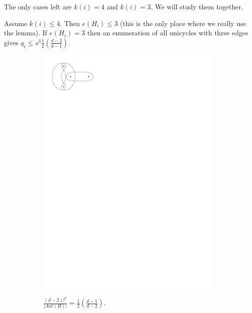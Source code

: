 \documentclass[11pt,notitlepage,a4paper]{article}
\theoremstyle{definition}
\begin{document}
\par

The only cases left are $k(i)=4$ and $k(i)=3$. 
We will study them together. \par
Assume $k(i)\leq 4$. Then $e(H_i)\leq 3$ 
(this is the only place where we 
really use the lemma).
If $e(H_i)=3$ then an enumeration
of all unicycles with three edges gives $q_i 
\leq s^{3}\frac{1}{2} \left( \frac{d-2}{d-1} \right)$. \par
\begin{figure}[H]
	\begin{subfigure}{.3\linewidth}
		\centering
		\includegraphics[width=0.7\linewidth]{Graph3edge1.pdf}
		\caption{$\frac{(d-2)!^3}{|Aut(H)|}=\frac{1}{2}
		\left(\frac{d-1}{d-2}\right)$.}
		\end{subfigure}
	\hfill
	\begin{subfigure}{.3\linewidth}
		\centering

\end{subfigure}
\end{figure}
\end{document}

